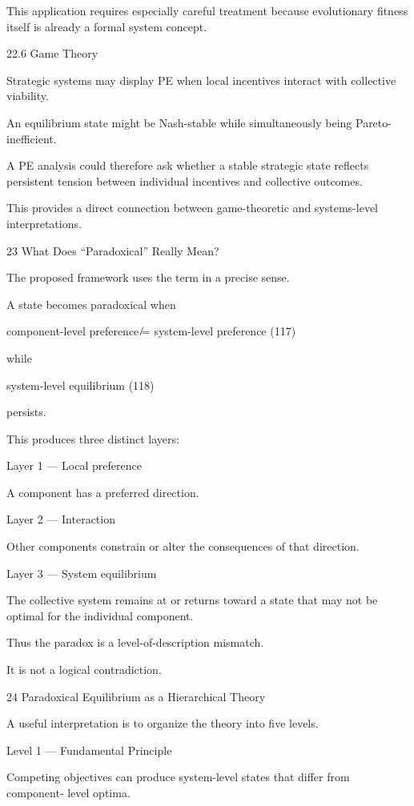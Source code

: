\documentclass[10pt,a4paper]{article}
\begin{document}
\begin{ManuscriptText}
This application requires especially careful treatment because evolutionary fitness itself is already
a formal system concept.


22.6    Game Theory

Strategic systems may display PE when local incentives interact with collective viability.

An equilibrium state might be Nash-stable while simultaneously being Pareto-inefficient.

A PE analysis could therefore ask whether a stable strategic state reflects persistent tension
between individual incentives and collective outcomes.

This provides a direct connection between game-theoretic and systems-level interpretations.


23      What Does “Paradoxical” Really Mean?

The proposed framework uses the term in a precise sense.

A state becomes paradoxical when


                      component-level preference ̸= system-level preference                    (117)

while


                                       system-level equilibrium                          (118)

persists.

This produces three distinct layers:


Layer 1 — Local preference

A component has a preferred direction.


Layer 2 — Interaction

Other components constrain or alter the consequences of that direction.


Layer 3 — System equilibrium

The collective system remains at or returns toward a state that may not be optimal for the
individual component.

Thus the paradox is a level-of-description mismatch.

It is not a logical contradiction.


24     Paradoxical Equilibrium as a Hierarchical Theory

A useful interpretation is to organize the theory into five levels.


Level 1 — Fundamental Principle

      Competing objectives can produce system-level states that differ from component-
      level optima.



\end{ManuscriptText}
\end{document}
